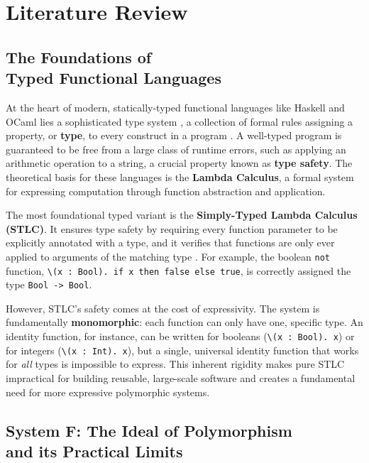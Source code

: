 \chapter{Literature Review}
\label{chap:LiteratureReview}

\section[The Foundations of Typed Functional Languages]{The Foundations of \\ Typed Functional Languages}
\label{sec:LitReviewFoundations}

At the heart of modern, statically-typed functional languages like Haskell and OCaml lies a sophisticated type system \cite{haskell-type-systems-research, ocaml-papers}, a collection of formal rules assigning a property, or \textbf{type}, to every construct in a program \cite{pierce-types-2002}. A well-typed program is guaranteed to be free from a large class of runtime errors, such as applying an arithmetic operation to a string, a crucial property known as \textbf{type safety}. The theoretical basis for these languages is the \textbf{Lambda Calculus}, a formal system for expressing computation through function abstraction and application.

The most foundational typed variant is the \textbf{Simply-Typed Lambda Calculus (STLC)}. It ensures type safety by requiring every function parameter to be explicitly annotated with a type, and it verifies that functions are only ever applied to arguments of the matching type \cite{Pierce-SF2}. For example, the boolean \texttt{not} function, \texttt{\textbackslash(x : Bool). if x then false else true}, is correctly assigned the type \texttt{Bool -> Bool}.

However, STLC's safety comes at the cost of expressivity. The system is fundamentally \textbf{monomorphic}: each function can only have one, specific type. An identity function, for instance, can be written for booleans (\texttt{\textbackslash(x~:~Bool).~x}) or for integers (\texttt{\textbackslash(x~:~Int).~x}), but a single, universal identity function that works for \textit{all} types is impossible to express. This inherent rigidity makes pure STLC impractical for building reusable, large-scale software and creates a fundamental need for more expressive polymorphic systems.

\section[System F: The Ideal of Polymorphism and its Limits]{System F: The Ideal of Polymorphism \\ and its Practical Limits}
\label{chap:LiteratureReview:sec:PolymorphismAndSystemF}


